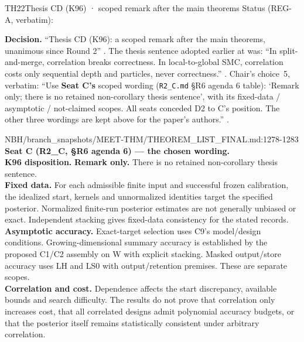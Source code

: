 \begin{card}{TH22}{Thesis CD (K96) · scoped remark after the main theorems}
Status (REG-A, verbatim):  

\textbf{Decision.} ``Thesis CD (K96): a scoped remark after the main theorems, unanimous since Round 2'' . The thesis sentence adopted earlier at  was: ``In split-and-merge, correlation breaks correctness. In local-to-global SMC, correlation costs only sequential depth and particles, never correctness.'' . Chair's choice~5, verbatim: ``Use \textbf{Seat C's} scoped wording (\texttt{R2\_C.md} §R6 agenda 6 table): `Remark only; there is no retained non-corollary thesis sentence', with its fixed-data / asymptotic / not-claimed scopes. All seats conceded D2 to C's position. The other three wordings are kept above for the paper's authors.'' .

\begin{stmt}{NBH/branch_snapshots/MEET-THM/THEOREM_LIST_FINAL.md:1278-1283}
\textbf{Seat C (R2\_C, §R6 agenda 6) — the chosen wording.}\\
\textbf{K96 disposition.} \textbf{Remark only.} There is no retained non-corollary thesis sentence.\\
\textbf{Fixed data.} For each admissible finite input and successful frozen calibration, the idealized start, kernels and unnormalized identities target the specified posterior. Normalized finite-run posterior estimates are not generally unbiased or exact. Independent stacking gives fixed-data consistency for the stated records.\\
\textbf{Asymptotic accuracy.} Exact-target selection uses C9’s model/design conditions. Growing-dimensional summary accuracy is established by the proposed C1/C2 assembly on W with explicit stacking. Masked output/store accuracy uses LH and LS0 with output/retention premises. These are separate scopes.\\
\textbf{Correlation and cost.} Dependence affects the start discrepancy, available bounds and search difficulty. The results do not prove that correlation only increases cost, that all correlated designs admit polynomial accuracy budgets, or that the posterior itself remains statistically consistent under arbitrary correlation.
\end{stmt}


\end{card}

